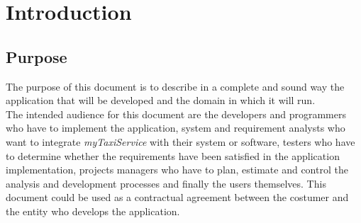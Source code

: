 \documentclass[a4paper,11pt]{report} %
\newcommand{\mts}{\mbox{\normalfont\itshape myTaxiService}}
\begin{document}
	\section{Introduction}
	
	\subsection{Purpose} The purpose of this document is to describe in a complete and sound way
	the  application that will be developed and the domain in which it will run.\\
	The intended audience for this document are the developers and programmers
	who have to implement the application, system and requirement
	analysts who want to integrate \mts{} with their system or software,
	testers who have to determine whether the requirements have been satisfied in
	the application implementation, projects managers who have to plan, estimate
	and control the analysis and development processes and finally the users themselves.
	This document could be used as a contractual agreement between the costumer
	and the entity who develops the application.
	
\end{document}
